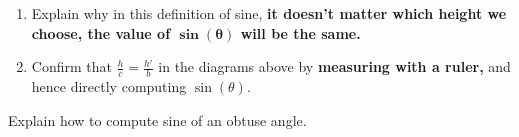 \documentclass[noauthor,nooutcomes,hints,,12pt]{ximera}
\begin{document}
\begin{question}
\begin{enumerate}
\begin{center}
      \end{center}
      
     \item       
       Explain why in this definition of sine, \textbf{it doesn't matter which
         height we choose, the value of $\boldsymbol{\sin(\theta)}$ will be the same.}

     \item Confirm that $\frac{h}{c} = \frac{h'}{b}$ in the diagrams
       above by \textbf{measuring with a ruler,} and hence directly computing
       $\sin(\theta)$.
        \end{enumerate}
\end{question}

\mynewpage

\begin{question}
  Explain how to compute sine of an obtuse angle.
\end{question}
\end{document}
